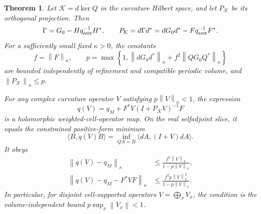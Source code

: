 \documentclass[11pt]{article}
\newtheorem{theorem}{Theorem}[section]
\theoremstyle{remark}
\newcommand{\norm}[1]{\left\|#1\right\|}
\begin{document}
\begin{theorem}\label{curv-theorem}
Let $\mathcal K=\overline{d\ker Q}$ in the curvature Hilbert space,
and let $P_{\mathcal K}$ be its orthogonal projection. Then
\begin{equation}\label{curv-projection}
 \Gamma=G_0-Hq_{\rm aux}^{-1}H^*,\qquad
 P_{\mathcal K}=d\Gamma d^*
   =dG_0d^*-Fq_{\rm aux}^{-1}F^*.
\end{equation}
For a sufficiently small fixed $\kappa>0$, the constants
\begin{equation}\label{curv-local-constants}
 f=\norm{F}_\kappa,\qquad
 p=\max\left\{1,\norm{dG_0d^*}_\kappa
                  +f^2\norm{QG_0Q^*}_\kappa\right\}
\end{equation}
are bounded independently of refinement and compatible periodic
volume, and $\norm{P_{\mathcal K}}_\kappa\le p$.

For any complex curvature operator $V$ satisfying
$p\norm{V}_\kappa<1$, the expression
\begin{equation}\label{curv-holomorphic-action}
 q(V)=q_M+F^*V(I+P_{\mathcal K}V)^{-1}F
\end{equation}
is a holomorphic weighted-cell-operator map. On the real selfadjoint
slice, it equals the constrained positive-form minimum
\begin{equation}\label{curv-real-minimum}
 \langle B,q(V)B\rangle
   =\inf_{QA=B}\langle dA,(I+V)dA\rangle.
\end{equation}
It obeys
\begin{align}
 \norm{q(V)-q_M}_\kappa
   &\le\frac{f^2\norm{V}_\kappa}{1-p\norm{V}_\kappa},
       \label{curv-first-bound}\\
 \norm{q(V)-q_M-F^*VF}_\kappa
   &\le\frac{f^2p\norm{V}_\kappa^2}{1-p\norm{V}_\kappa}.
       \label{curv-remainder-bound}
\end{align}
In particular, for disjoint cell-supported operators
$V=\bigoplus_x V_x$, the condition is the volume-independent bound
$p\sup_x\norm{V_x}<1$.
\end{theorem}
\end{document}
